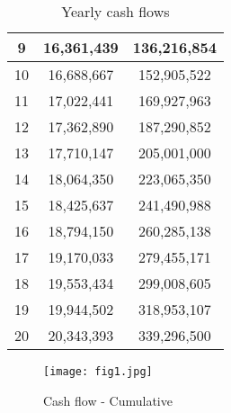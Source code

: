 \documentclass[conference]{IEEEtran}
\begin{document}
\begin{table}[!]
\begin{tabular}{|c|c|c|}
9                                                          & 16,361,439                                                    & 136,216,854                                                      \\ \hline
10                                                         & 16,688,667                                                    & 152,905,522                                                      \\ \hline
11                                                         & 17,022,441                                                    & 169,927,963                                                      \\ \hline
12                                                         & 17,362,890                                                    & 187,290,852                                                      \\ \hline
13                                                         & 17,710,147                                                    & 205,001,000                                                      \\ \hline
14                                                         & 18,064,350                                                    & 223,065,350                                                      \\ \hline
15                                                         & 18,425,637                                                    & 241,490,988                                                      \\ \hline
16                                                         & 18,794,150                                                    & 260,285,138                                                      \\ \hline
17                                                         & 19,170,033                                                    & 279,455,171                                                      \\ \hline
18                                                         & 19,553,434                                                    & 299,008,605                                                      \\ \hline
19                                                         & 19,944,502                                                    & 318,953,107                                                      \\ \hline
20                                                         & 20,343,393                                                    & 339,296,500                                                      \\ \hline
\end{tabular}
\caption{Yearly cash flows}
\label{tt}
\end{table}
\begin{figure}[!]
\centerline{\texttt{[image: fig1.jpg]}}
\caption{Cash flow - Cumulative}
\label{fig4}
\end{figure}
\end{document}

